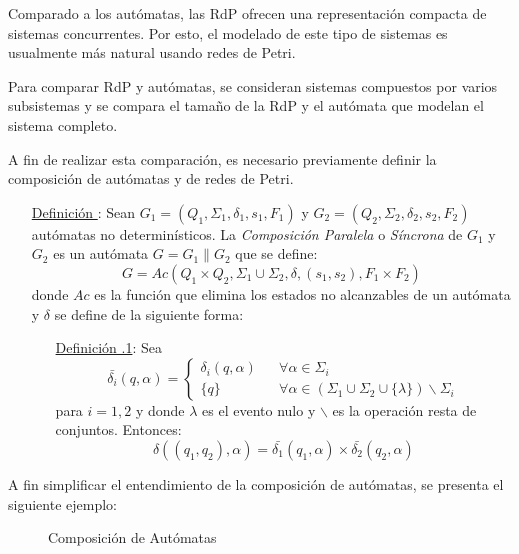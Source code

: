 Comparado a los autómatas, las RdP ofrecen una representación compacta de
sistemas concurrentes. Por esto, el modelado de este tipo de sistemas es
usualmente más natural usando redes de Petri. \cite{Iordache:2006:SCC:1197724}

Para comparar RdP y autómatas, se consideran sistemas compuestos por varios
subsistemas y se compara el tamaño de la RdP y el autómata que modelan el
sistema completo.

A fin de realizar esta comparación, es necesario previamente definir la
composición de autómatas y de redes de Petri.\cite{Iordache:2006:SCC:1197724}

\begin{itemize}
  \item [\underline{Definición \thedefinitionsCounter}:] Sean $G_{1} = (Q_{1}, \Sigma_{1},
  \delta_{1}, s_{1}, F_{1})$ y $G_{2} = (Q_{2}, \Sigma_{2}, \delta_{2}, s_{2},
  F_{2})$ autómatas no determinísticos. La \textit{Composición Paralela} o
  \textit{Síncrona} de $G_{1}$ y $G_{2}$ es un autómata $G = G_{1} \parallel
  G_{2}$ que se define:
  $$ G = Ac(Q_{1} \times Q_{2}, \Sigma_{1} \cup \Sigma_{2}, \delta, (s_{1},
  s_{2}), F_{1} \times F_{2}) $$ donde $Ac$ es la función que elimina los estados no
 alcanzables de un autómata y $ \delta $ se define de la siguiente forma:
 \begin{itemize}
  \item [\underline{Definición \thedefinitionsCounter.1}:] Sea
   $$ \bar{\delta_{i}}(q,\alpha) =
   \left\{ 
     \begin{array}{lll}
      \delta_{i}(q, \alpha) & & \forall \alpha \in \Sigma_{i} \\
      \{q\} & & \forall \alpha \in (\Sigma_{1} \cup \Sigma_{2} \cup \{\lambda\})
      \backslash \Sigma_{i}
     \end{array}
   \right. $$
   para $i = 1,2$ y donde $\lambda$ es el evento nulo y $\backslash$ es la
   operación resta de conjuntos.
   Entonces: $$ \delta((q_{1},
   q_{2}), \alpha) = \bar{\delta_{1}}(q_{1}, \alpha) \times \bar{\delta_{2}}(q_{2}, \alpha) $$
 \end{itemize}
\end{itemize}

A fin simplificar el entendimiento de la composición de autómatas, se presenta
el siguiente ejemplo:

\begin{figure}[h]
  \centering
  \caption{Composición de Autómatas}
  \label{fig:composicion_automatas}
\end{figure}

